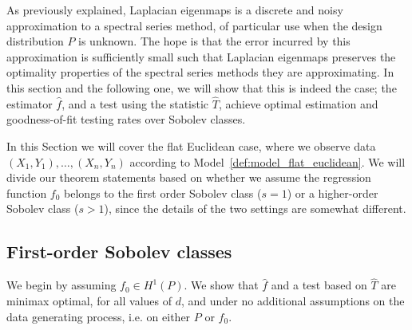 \documentclass{article}
\newcommand{\1}{\mathbf{1}}
\newcommand{\wh}[1]{\widehat{#1}}
\theoremstyle{alden}
\theoremstyle{aldenthm}
\theoremstyle{definition}
\theoremstyle{remark}
\begin{document}
As previously explained, Laplacian eigenmaps is a discrete and noisy approximation to a spectral series method, of particular use when the design distribution $P$ is unknown. The hope is that the error incurred by this approximation is sufficiently small such that Laplacian eigenmaps preserves the optimality properties of the spectral series methods they are approximating. In this section and the following one, we will show that this is indeed the case; the estimator $\wh{f}$, and a test using the statistic $\wh{T}$, achieve optimal estimation and goodness-of-fit testing rates over Sobolev classes. 

In this Section we will cover the flat Euclidean case, where we observe data $(X_1,Y_1),\ldots,(X_n,Y_n)$ according to Model~\ref{def:model_flat_euclidean}. We will divide our theorem statements based on whether we assume the regression function $f_0$ belongs to the first order Sobolev class ($s = 1$) or a higher-order Sobolev class ($s > 1$), since the details of the two settings are somewhat different.

\subsection{First-order Sobolev classes}
\label{sec:first_order_sobolev_classes}
We begin by assuming $f_0 \in H^1(P)$. We show that $\wh{f}$ and a test based on $\wh{T}$ are minimax optimal, for all values of $d$, and under no additional assumptions on the data generating process, i.e. on either $P$ or $f_0$.
\end{document}
